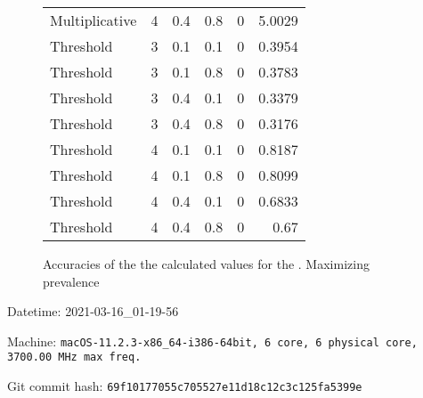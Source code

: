 \documentclass{article}
\begin{document}
\begin{figure}[H]
\begin{tabular}{lrrrrr}
 Multiplicative &       4 &   0.4 &            0.8 &       0 &            5.0029 \\
 Threshold      &       3 &   0.1 &            0.1 &       0 &            0.3954 \\
 Threshold      &       3 &   0.1 &            0.8 &       0 &            0.3783 \\
 Threshold      &       3 &   0.4 &            0.1 &       0 &            0.3379 \\
 Threshold      &       3 &   0.4 &            0.8 &       0 &            0.3176 \\
 Threshold      &       4 &   0.1 &            0.1 &       0 &            0.8187 \\
 Threshold      &       4 &   0.1 &            0.8 &       0 &            0.8099 \\
 Threshold      &       4 &   0.4 &            0.1 &       0 &            0.6833 \\
 Threshold      &       4 &   0.4 &            0.8 &       0 &            0.67   \\
\hline
\end{tabular}
\caption{Accuracies of the the calculated values for the \penetrances. Maximizing prevalence}
\end{figure}
Datetime: 2021-03-16\_01-19-56

Machine: \texttt{macOS-11.2.3-x86\_64-i386-64bit, 6 core, 6 physical core, 3700.00 MHz max freq.}

Git commit hash: \texttt{69f10177055c705527e11d18c12c3c125fa5399e}
\end{document}
